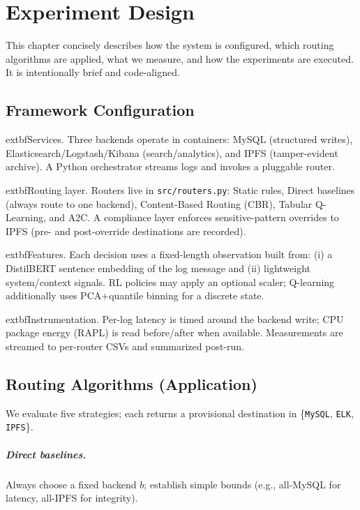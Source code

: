 \chapter{Experiment Design}\label{ch:experiment-design}

This chapter concisely describes how the system is configured, which routing algorithms are applied, what we measure, and how the experiments are executed. It is intentionally brief and code-aligned.

\section{Framework Configuration}\label{s:framework-config}
	extbf{Services.} Three backends operate in containers: MySQL (structured writes), Elasticsearch/Logstash/Kibana (search/analytics), and IPFS (tamper-evident archive). A Python orchestrator streams logs and invokes a pluggable router.

	extbf{Routing layer.} Routers live in \texttt{src/routers.py}: Static rules, Direct baselines (always route to one backend), Content-Based Routing (CBR), Tabular Q-Learning, and A2C. A compliance layer enforces sensitive-pattern overrides to IPFS (pre- and post-override destinations are recorded).

	extbf{Features.} Each decision uses a fixed-length observation built from: (i) a DistilBERT sentence embedding of the log message and (ii) lightweight system/context signals. RL policies may apply an optional scaler; Q-learning additionally uses PCA+quantile binning for a discrete state.

	extbf{Instrumentation.} Per-log latency is timed around the backend write; CPU package energy (RAPL) is read before/after when available. Measurements are streamed to per-router CSVs and summarized post-run.

\section{Routing Algorithms (Application)}\label{s:algorithms}
We evaluate five strategies; each returns a provisional destination in \{\texttt{MySQL}, \texttt{ELK}, \texttt{IPFS}\}.

\paragraph{Direct baselines.} Always choose a fixed backend $b$; establish simple bounds (e.g., all-MySQL for latency, all-IPFS for integrity).

